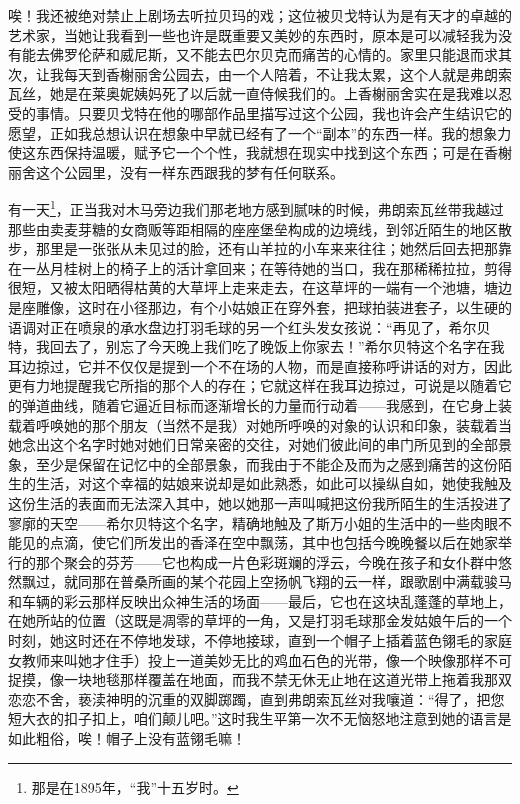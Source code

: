 \par 唉！我还被绝对禁止上剧场去听拉贝玛的戏；这位被贝戈特认为是有天才的卓越的艺术家，当她让我看到一些也许是既重要又美妙的东西时，原本是可以减轻我为没有能去佛罗伦萨和威尼斯，又不能去巴尔贝克而痛苦的心情的。家里只能退而求其次，让我每天到香榭丽舍公园去，由一个人陪着，不让我太累，这个人就是弗朗索瓦丝，她是在莱奥妮姨妈死了以后就一直侍候我们的。上香榭丽舍实在是我难以忍受的事情。只要贝戈特在他的哪部作品里描写过这个公园，我也许会产生结识它的愿望，正如我总想认识在想象中早就已经有了一个“副本”的东西一样。我的想象力使这东西保持温暖，赋予它一个个性，我就想在现实中找到这个东西；可是在香榭丽舍这个公园里，没有一样东西跟我的梦有任何联系。
\par 有一天\footnote{那是在1895年，“我”十五岁时。}，正当我对木马旁边我们那老地方感到腻味的时候，弗朗索瓦丝带我越过那些由卖麦芽糖的女商贩等距相隔的座座堡垒构成的边境线，到邻近陌生的地区散步，那里是一张张从未见过的脸，还有山羊拉的小车来来往往；她然后回去把那靠在一丛月桂树上的椅子上的活计拿回来；在等待她的当口，我在那稀稀拉拉，剪得很短，又被太阳晒得枯黄的大草坪上走来走去，在这草坪的一端有一个池塘，塘边是座雕像，这时在小径那边，有个小姑娘正在穿外套，把球拍装进套子，以生硬的语调对正在喷泉的承水盘边打羽毛球的另一个红头发女孩说：“再见了，希尔贝特，我回去了，别忘了今天晚上我们吃了晚饭上你家去！”希尔贝特这个名字在我耳边掠过，它并不仅仅是提到一个不在场的人物，而是直接称呼讲话的对方，因此更有力地提醒我它所指的那个人的存在；它就这样在我耳边掠过，可说是以随着它的弹道曲线，随着它逼近目标而逐渐增长的力量而行动着——我感到，在它身上装载着呼唤她的那个朋友（当然不是我）对她所呼唤的对象的认识和印象，装载着当她念出这个名字时她对她们日常亲密的交往，对她们彼此间的串门所见到的全部景象，至少是保留在记忆中的全部景象，而我由于不能企及而为之感到痛苦的这份陌生的生活，对这个幸福的姑娘来说却是如此熟悉，如此可以操纵自如，她使我触及这份生活的表面而无法深入其中，她以她那一声叫喊把这份我所陌生的生活投进了寥廓的天空——希尔贝特这个名字，精确地触及了斯万小姐的生活中的一些肉眼不能见的点滴，使它们所发出的香泽在空中飘荡，其中也包括今晚晚餐以后在她家举行的那个聚会的芬芳——它也构成一片色彩斑斓的浮云，今晚在孩子和女仆群中悠然飘过，就同那在普桑所画的某个花园上空扬帆飞翔的云一样，跟歌剧中满载骏马和车辆的彩云那样反映出众神生活的场面——最后，它也在这块乱蓬蓬的草地上，在她所站的位置（这既是凋零的草坪的一角，又是打羽毛球那金发姑娘午后的一个时刻，她这时还在不停地发球，不停地接球，直到一个帽子上插着蓝色翎毛的家庭女教师来叫她才住手）投上一道美妙无比的鸡血石色的光带，像一个映像那样不可捉摸，像一块地毯那样覆盖在地面，而我不禁无休无止地在这道光带上拖着我那双恋恋不舍，亵渎神明的沉重的双脚踯躅，直到弗朗索瓦丝对我嚷道：“得了，把您短大衣的扣子扣上，咱们颠儿吧。”这时我生平第一次不无恼怒地注意到她的语言是如此粗俗，唉！帽子上没有蓝翎毛嘛！

